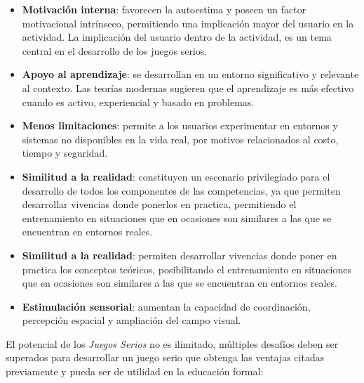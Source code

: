 \begin{itemize}

\item \textbf{Motivación interna}: favorecen la autoestima y poseen un factor
    motivacional intrínseco\cite{guenaga2013serious,martin2008modelo},
    permitiendo una implicación mayor del usuario en la
    actividad\cite{sg:aoverview}. La implicación del usuario dentro de la
    actividad, es un tema central en el desarrollo de los juegos
    serios\cite{charsky:2010}.

\item \textbf{Apoyo al aprendizaje}: se desarrollan en un entorno significativo
    y relevante al contexto\cite{sg:aoverview}. Las teorías modernas sugieren
    que el aprendizaje es más efectivo cuando es activo, experiencial y basado
    en problemas\cite{guenaga2013serious}.

\item \textbf{Menos limitaciones}: permite a los usuarios experimentar en
    entornos y sistemas no disponibles en la vida real, por motivos relacionados
    al costo, tiempo y seguridad\cite{sg:aoverview}.
    
\item \textbf{Similitud a la realidad}: constituyen un escenario privilegiado
    para el desarrollo de todos los componentes de las competencias, ya que
    permiten desarrollar vivencias donde ponerlos en practica, permitiendo el
    entrenamiento en situaciones que en ocasiones son similares a las que se
    encuentran en entornos reales\cite{guenaga2013serious,sg:aoverview}.
    
\item \textbf{Similitud a la realidad}: permiten desarrollar vivencias donde
    poner en practica los conceptos teóricos, posibilitando el entrenamiento en
    situaciones que en ocasiones son similares a las que se encuentran en
    entornos reales\cite{guenaga2013serious,sg:aoverview}.

\item \textbf{Estimulación sensorial}: aumentan la capacidad de coordinación,
    percepción espacial y ampliación del campo visual\cite{guenaga2013serious}. 

\end{itemize}

El potencial de los \emph{Juegos Serios} no es ilimitado, múltiples desafíos
deben ser superados para desarrollar un juego serio que obtenga las ventajas
citadas previamente y pueda ser de utilidad en la educación formal:


